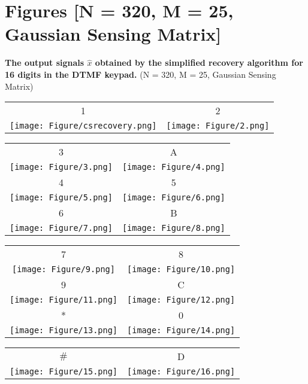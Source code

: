 \chapter{Figures [N = 320, M = 25, Gaussian Sensing Matrix]} \label{A}


\textbf{The output signals $\hat{x}$ obtained by the simplified recovery algorithm for 16 digits in the DTMF keypad.}
(N = 320, M = 25, Gaussian Sensing Matrix)

\begin{table}[h]
\begin{tabular}{cc}
1 & 2 \\
\texttt{[image: Figure/csrecovery.png]} &
\texttt{[image: Figure/2.png]} \\
\end{tabular}
\end{table}

\begin{table}[h]
\begin{tabular}{cc}
3 & A \\
\texttt{[image: Figure/3.png]} &
\texttt{[image: Figure/4.png]} \\
4 & 5 \\
\texttt{[image: Figure/5.png]} &
\texttt{[image: Figure/6.png]} \\
6 & B \\
\texttt{[image: Figure/7.png]} &
\texttt{[image: Figure/8.png]} \\
\end{tabular}
\end{table}

\begin{table}[h]
\begin{tabular}{cc}
7 & 8 \\
\texttt{[image: Figure/9.png]} &
\texttt{[image: Figure/10.png]} \\
9 & C \\
\texttt{[image: Figure/11.png]} &
\texttt{[image: Figure/12.png]} \\
* & 0 \\
\texttt{[image: Figure/13.png]} &
\texttt{[image: Figure/14.png]} \\
\end{tabular}
\end{table}

\begin{table}[h]
\begin{tabular}{cc}
$\#$ & D \\
\texttt{[image: Figure/15.png]} &
\texttt{[image: Figure/16.png]} \\
\end{tabular}
\end{table}

